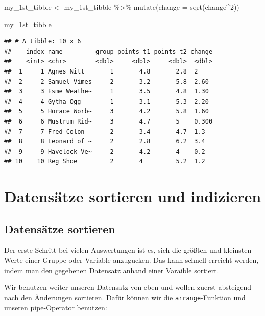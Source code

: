 \documentclass[
]{book}
\newenvironment{Shaded}{\begin{snugshade}}{\end{snugshade}}
\newcommand{\AttributeTok}[1]{\textcolor[rgb]{0.77,0.63,0.00}{#1}}
\newcommand{\DecValTok}[1]{\textcolor[rgb]{0.00,0.00,0.81}{#1}}
\newcommand{\FunctionTok}[1]{\textcolor[rgb]{0.00,0.00,0.00}{#1}}
\newcommand{\NormalTok}[1]{#1}
\newcommand{\OtherTok}[1]{\textcolor[rgb]{0.56,0.35,0.01}{#1}}
\newcommand{\SpecialCharTok}[1]{\textcolor[rgb]{0.00,0.00,0.00}{#1}}
\begin{document}
\begin{Shaded}
\begin{Highlighting}[]
\NormalTok{my\_1st\_tibble }\OtherTok{\textless{}{-}}\NormalTok{ my\_1st\_tibble }\SpecialCharTok{\%\textgreater{}\%} 
  \FunctionTok{mutate}\NormalTok{(}\AttributeTok{change =} \FunctionTok{sqrt}\NormalTok{(change}\SpecialCharTok{\^{}}\DecValTok{2}\NormalTok{))}

\NormalTok{my\_1st\_tibble}
\end{Highlighting}
\end{Shaded}

\begin{verbatim}
## # A tibble: 10 x 6
##    index name         group points_t1 points_t2 change
##    <int> <chr>        <dbl>     <dbl>     <dbl>  <dbl>
##  1     1 Agnes Nitt       1       4.8       2.8  2    
##  2     2 Samuel Vimes     2       3.2       5.8  2.60 
##  3     3 Esme Weathe~     1       3.5       4.8  1.30 
##  4     4 Gytha Ogg        1       3.1       5.3  2.20 
##  5     5 Horace Worb~     3       4.2       5.8  1.60 
##  6     6 Mustrum Rid~     3       4.7       5    0.300
##  7     7 Fred Colon       2       3.4       4.7  1.3  
##  8     8 Leonard of ~     2       2.8       6.2  3.4  
##  9     9 Havelock Ve~     2       4.2       4    0.2  
## 10    10 Reg Shoe         2       4         5.2  1.2
\end{verbatim}

\hypertarget{datensuxe4tze-sortieren-und-indizieren}{%
\section{Datensätze sortieren und indizieren}\label{datensuxe4tze-sortieren-und-indizieren}}

\hypertarget{datensuxe4tze-sortieren}{%
\subsection{Datensätze sortieren}\label{datensuxe4tze-sortieren}}

Der erste Schritt bei vielen Auswertungen ist es, sich die größten und kleinsten Werte einer Gruppe oder Variable anzugucken. Das kann schnell erreicht werden, indem man den gegebenen Datensatz anhand einer Varaible sortiert.

Wir benutzen weiter unseren Datensatz von eben und wollen zuerst absteigend nach den Änderungen sortieren.
Dafür können wir die \texttt{arrange}-Funktion und unseren pipe-Operator benutzen:
\end{document}
